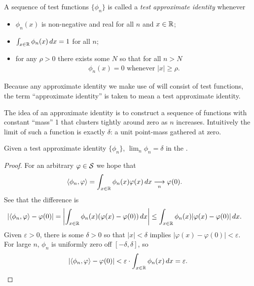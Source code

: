     \begin{defn}
      A sequence of test functions $\{\phi_n\}$ is called a \emph{test approximate identity} whenever
      \begin{itemize}
        \item $\phi_n(x)$ is non-negative and real for all $n$ and $x\in\R$;
        \item $\int_{x\in\R}\phi_n(x)\,dx=1$ for all $n$;
        \item for any $\rho>0$ there exists some $N$ so that for all $n>N$ 
          \begin{align*}
            \phi_n(x) = 0 \text{ whenever } |x|\ge\rho \text{.}
          \end{align*}
      \end{itemize}
      Because any approximate identity we make use of will consist of  test functions, the term ``approximate identity'' is taken to mean a test approximate identity.
    \end{defn}
    The idea of an approximate identity is to construct a sequence of functions with constant ``mass'' 1 that clusters tightly around zero as $n$ increases.
    Intuitively the limit of such a function is exactly $\delta$: a unit point-mass gathered at zero.

    \begin{thm}
      \label{thm:approxid}
      Given a test approximate identity $\{\phi_n\}$, $\lim_n \phi_n = \delta$ in the \ws.
    \end{thm}
    \begin{proof}
      For an arbitrary $\varphi\in\S$ we hope that
      \begin{align*}
        \langle\phi_n,\varphi\rangle 
        &=\int_{x\in\R} \phi_n(x)\varphi(x)\,dx
        \underset{n}{\longrightarrow}\varphi(0) \text{.}
      \end{align*}
      See that the difference is
      \begin{align*}
        |\langle\phi_n,\varphi\rangle - \varphi(0)|
        &=\left| \int_{x\in\R} \phi_n(x)(\varphi(x)-\varphi(0))\,dx \right|
        \le \int_{x\in\R} \phi_n(x)|\varphi(x)-\varphi(0)|\,dx \text{.}
      \end{align*}
      Given $\varepsilon>0$, there is some $\delta>0$ so that $|x|<\delta$ implies $|\varphi(x)-\varphi(0)|<\varepsilon$.
      For large $n$, $\phi_n$ is uniformly zero off $[-\delta,\delta]$, so
      \begin{align*}
        |\langle\phi_n,\varphi\rangle - \varphi(0)|
        < \varepsilon \cdot \int_{x\in\R} \phi_n(x)\,dx
        = \varepsilon \text{.}
      \end{align*}
    \end{proof}

